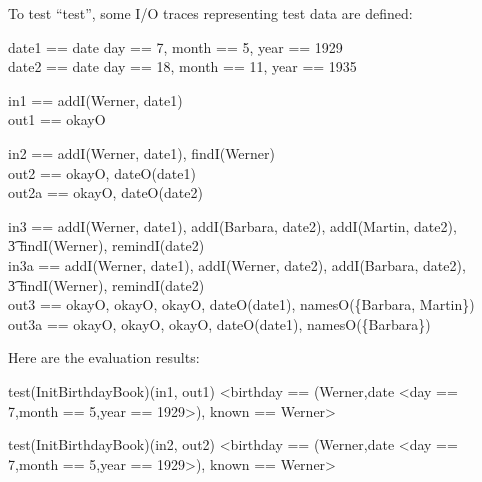 \documentclass{article}
\begin{document}
To test ``test'', some I/O traces representing test data are defined:

\begin{axdef}
 date1 == date \lbind   day == 7, month == 5, year == 1929 \rbind\\
 date2 == date \lbind   day == 18, month == 11, year == 1935 \rbind\\
\end{axdef}

\begin{axdef}
 in1  == \langle addI(Werner, date1) \rangle \\
 out1 == \langle okayO \rangle 
\end{axdef}

\begin{axdef}
 in2   ==  \langle addI(Werner, date1), findI(Werner) \rangle \\
 out2  ==  \langle okayO, dateO(date1) \rangle\\
 out2a ==  \langle okayO, dateO(date2) \rangle
\end{axdef}

\begin{axdef}
 in3  == \langle addI(Werner, date1), addI(Barbara, date2), 
                 addI(Martin, date2),\\\t3
                 findI(Werner), remindI(date2) \rangle \\
 in3a  ==  \langle addI(Werner, date1), addI(Werner, date2), 
                 addI(Barbara, date2),\\\t3
                 findI(Werner), remindI(date2) \rangle \\
 out3 ==  \langle okayO, okayO, okayO, dateO(date1), 
                  namesO(\{Barbara, Martin\}) \rangle \\
 out3a ==  \langle okayO, okayO, okayO, dateO(date1), 
                   namesO(\{Barbara\}) \rangle \\
\end{axdef}

Here are the evaluation results:

\begin{zexecexpr}
 test(InitBirthdayBook)(in1, out1)
\yields
{<birthday == {(Werner,date <day == 7,month == 5,year == 1929>)},
  known == {Werner}>}
\end{zexecexpr}

\begin{zexecexpr}
 test(InitBirthdayBook)(in2, out2)  
\yields
{<birthday == {(Werner,date <day == 7,month == 5,year == 1929>)},
  known == {Werner}>}
\end{zexecexpr}
\end{document}
